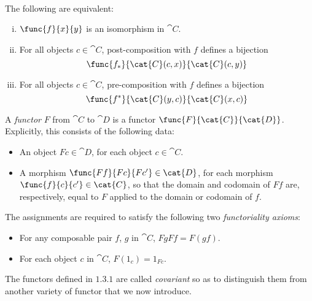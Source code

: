 \documentclass[main.tex]{subfiles}
\begin{document}
\paragraph{}
\begin{lemma}
	The following are equivalent:
	\begin{enumerate}[(i)]
		\item $\func{f}{x}{y}$ is an isomorphism in $\cat{C}$.

		\item For all objects $c\in\cat{C}$, post-composition with $f$ defines a
			bijection \[\func{f_*}{\cat{C}(c,x)}{\cat{C}(c,y)}\]

		\item For all objects $c\in\cat{C}$, pre-composition with $f$ defines a
			bijection \[\func{f^*}{\cat{C}(y,c)}{\cat{C}(x,c)}\]
	\end{enumerate}
\end{lemma}

\begin{definition}
	A \emph{functor} $F$ from $\cat{C}$ to $\cat{D}$ is a functor
	$\func{F}{\cat{C}}{\cat{D}}$. Explicitly, this consists of the following
	data:
	\begin{itemize}
		\item An object $Fc\in \cat{D}$, for each object $c\in \cat{C}$.

		\item A morphism $\func{Ff}{Fc}{Fc'}\in \cat{D}$, for each morphism
			$\func{f}{c}{c'}\in \cat{C}$, so that the domain and codomain of
			$Ff$ are, respectively, equal to $F$ applied to the domain or
			codomain of $f$.
	\end{itemize}
	The assignments are required to satisfy the following two
	\emph{functoriality axioms}:
	\begin{itemize}
		\item For any composable pair $f$, $g$ in $\cat{C}$, $Fg Ff =
			F(g f)$.

		\item For each object $c$ in $\cat{C}$, $F(1_c) = 1_{Fc}$.
	\end{itemize}
\end{definition}
The functors defined in $1.3.1$ are called \emph{covariant} so as to distinguish
them from another variety of functor that we now introduce.
\end{document}
